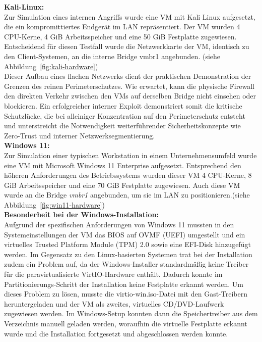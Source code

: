 \textbf{Kali-Linux:}\\
Zur Simulation eines internen Angriffs wurde eine VM mit Kali Linux aufgesetzt, die ein kompromittiertes Endgerät im LAN repräsentiert. Der VM wurden 4 CPU-Kerne, 4 GiB Arbeitsspeicher und eine 50 GiB Festplatte zugewiesen. Entscheidend für diesen Testfall wurde die Netzwerkkarte der VM, identisch zu den Client-Systemen, an die interne Bridge vmbr1 angebunden. (siehe Abbildung~\ref{fig:kali-hardware})\\
Dieser Aufbau eines flachen Netzwerks dient der praktischen Demonstration der Grenzen des reinen Perimeterschutzes. Wie erwartet, kann die physische Firewall den direkten Verkehr zwischen den VMs auf derselben Bridge nicht einsehen oder blockieren. Ein erfolgreicher interner Exploit demonstriert somit die kritische Schutzlücke, die bei alleiniger Konzentration auf den Perimeterschutz entsteht und unterstreicht die Notwendigkeit weiterführender Sicherheitskonzepte wie Zero-Trust und interner Netzwerksegmentierung.\\

\textbf{Windows 11:}\\
Zur Simulation einer typischen Workstation in einem Unternehmensumfeld wurde eine VM mit Microsoft Windows 11 Enterprise aufgesetzt. Entsprechend den höheren Anforderungen des Betriebssystems wurden dieser VM 4 CPU-Kerne, 8 GiB Arbeitsspeicher und eine 70 GiB Festplatte zugewiesen. Auch diese VM wurde an die Bridge \textit{vmbr1} angebunden, um sie im LAN zu positionieren.(siehe Abbildung~\ref{fig:win11-hardware})\\

\textbf{Besonderheit bei der Windows-Installation:}\\
Aufgrund der spezifischen Anforderungen von Windows 11 mussten in den Systemeinstellungen der VM das BIOS auf OVMF (UEFI) umgestellt und ein virtuelles Trusted Platform Module (TPM) 2.0 sowie eine EFI-Disk hinzugefügt werden.
 Im Gegensatz zu den Linux-basierten Systemen trat bei der Installation zudem ein Problem auf, da der Windows-Installer standardmäßig keine Treiber für die paravirtualisierte VirtIO-Hardware enthält. Dadurch konnte im Partitionierungs-Schritt der Installation keine Festplatte erkannt werden. Um dieses Problem zu lösen, musste die virtio-win.iso-Datei mit den Gast-Treibern heruntergeladen und der VM als zweites, virtuelles CD/DVD-Laufwerk zugewiesen werden. Im Windows-Setup konnten dann die Speichertreiber aus dem Verzeichnis  manuell geladen werden, woraufhin die virtuelle Festplatte erkannt wurde und die Installation fortgesetzt und abgeschlossen werden konnte.

